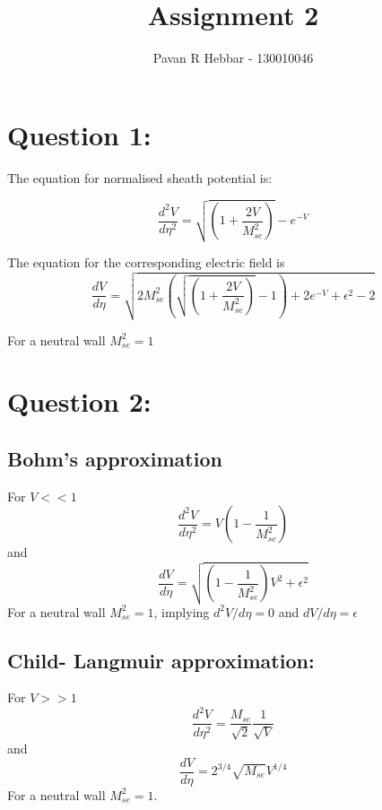\documentclass[11pt, a4paper]{article}
\title{\textbf{Assignment 2}}
\author{Pavan R Hebbar - 130010046}
\begin{document}
\maketitle
\newpage
\section{Question 1:}

The equation for normalised sheath potential is:

\begin{equation}
 \frac{d^2V}{d\eta^2} = \sqrt{\left(1+\frac{2V}{M_{se}^2}\right)} - e^{-V}
\end{equation}

The equation for the corresponding electric field is
\begin{equation}
 \frac{dV}{d\eta} = \sqrt{2M_{se}^2\left(\sqrt{\left(1+\frac{2V}{M_{se}^2}\right)}-1\right) + 2e^{-V} + \epsilon^2 - 2}
\end{equation}

For a neutral wall $M_{se}^2 = 1$

\section{Question 2:}
\subsection{Bohm's approximation}
For $V<<1$
\begin{equation}
 \frac{d^2V}{d\eta^2} = V\left(1-\frac{1}{M_{se}^2}\right)
\end{equation}
and
\begin{equation}
 \frac{dV}{d\eta} = \sqrt{\left(1 - \frac{1}{M_{se}^2}\right)V^2 + \epsilon^2}
\end{equation}
For a neutral wall $M_{se}^2 = 1$, implying $d^2V/d\eta = 0$ and $dV/d\eta = \epsilon$

\subsection{Child- Langmuir approximation:}
For $V>>1$
\begin{equation}
 \frac{d^2V}{d\eta^2} = \frac{M_{se}}{\sqrt{2}}\frac{1}{\sqrt{V}}
\end{equation}
and
\begin{equation}
 \frac{dV}{d\eta} = 2^{3/4}\sqrt{M_{se}}V^{1/4}
\end{equation}
For a neutral wall $M_{se}^2 = 1$.
\end{document}
